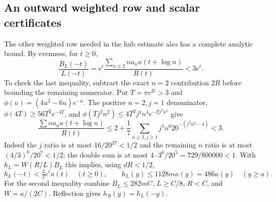 \subsection{An outward weighted row and scalar certificates}
The other weighted row needed in the hub estimate also has a complete
analytic bound. By evenness, for $t\ge0$,
\[
 \frac{B_L(-t)}{L(-t)}
 =e^t\frac{\sum_{n\ge2}n a_n\kappa(t+\log n)}{R(t)}<3e^t.
\]
To check the last inequality, subtract the exact $n=2$ contribution
$2R$ before bounding the remaining numerator. Put $T=\pi e^{2t}>3$
and $\phi(u)=(4u^2-6u)e^{-u}$. The positive $n=2,j=1$ denominator,
$\phi(4T)\ge56T^2e^{-4T}$, and
$\phi(Tj^2n^2)\le4T^2j^4n^4e^{-Tj^2n^2}$ give
\[
 \frac{\sum n a_n\kappa(t+\log n)}{R(t)}
 \le2+\frac17\sum_{n\ge3,j\ge1}j^4n^6
                         20^{-(j^2n^2-4)}<3.
\]
Indeed the $j$ ratio is at most $16/20^{27}<1/2$ and the remaining
$n$ ratio is at most $(4/3)^6/20^7<1/2$; the double sum is at most
$4\cdot3^6/20^5=729/800000<1$.
With $h_L=W(R/L)B_L$ this implies, using $dR<1/2$,
\begin{equation}\label{eq:dep-h-rows}
 h_L(-t)<\tfrac32e^t\kappa(t)\quad(t\ge0),\qquad
 h_L(y)\le1128m\kappa(y)=486\kappa(y)\quad(y\ge a).
\end{equation}
For the second inequality combine $B_L\le282mC$, $L\ge C/8$,
$R<C$, and $W=\kappa/(2C)$. Reflection gives $h_R(y)=h_L(-y)$.

